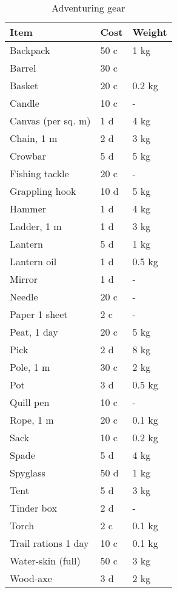 \documentclass[a4paper,11pt,oneside]{book}
\begin{document}
\begin{table}[ht]
	\centering
	\caption{Adventuring gear}
	\begin{tabular}{|l|l|l|}
		\hline
		Item & Cost & Weight\\ [0.5ex]
		\hline
		Backpack & 50 c & 1 kg\\
		Barrel & 30 c & \\
		Basket & 20 c & 0.2 kg\\
		Candle & 10 c & -\\
		Canvas (per sq. m) & 1 d & 4 kg\\
		Chain, 1 m & 2 d & 3 kg\\
		Crowbar & 5 d & 5 kg\\
		Fishing tackle & 20 c & -\\
		Grappling hook & 10 d & 5 kg\\
		Hammer & 1 d & 4 kg\\
		Ladder, 1 m & 1 d & 3 kg\\
		Lantern & 5 d & 1 kg\\
		Lantern oil & 1 d & 0.5 kg \\
		Mirror & 1 d & -\\
		Needle & 20 c & -\\
		Paper 1 sheet & 2 c & -\\
		Peat, 1 day & 20 c & 5 kg\\
		Pick & 2 d & 8 kg\\
		Pole, 1 m & 30 c & 2 kg\\
		Pot & 3 d & 0.5 kg\\
		Quill pen & 10 c & -\\
		Rope, 1 m & 20 c & 0.1 kg\\
		Sack & 10 c & 0.2 kg\\
		Spade & 5 d & 4 kg\\
		Spyglass & 50 d & 1 kg\\
		Tent & 5 d & 3 kg\\
		Tinder box & 2 d & -\\
		Torch & 2 c & 0.1 kg\\
		Trail rations 1 day & 10 c & 0.1 kg\\
		Water-skin (full) & 50 c & 3 kg\\	
		Wood-axe & 3 d & 2 kg\\	
		\hline
	\end{tabular}
\end{table}





\listoftables
\end{document}
